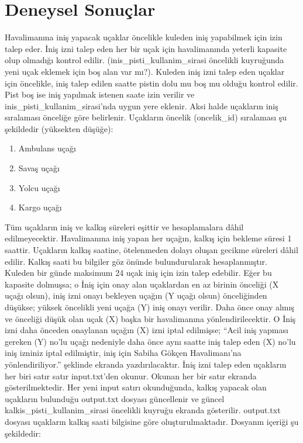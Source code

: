 \documentclass[conference]{IEEEtran}
\begin{document}
\section*{\textbf{\LARGE Deneysel Sonuçlar}}

Havalimanına iniş yapacak uçaklar öncelikle kuleden iniş yapabilmek için izin talep eder. İniş izni talep eden her bir uçak için havalimanında yeterli kapasite olup olmadığı kontrol edilir. (inis\_pisti\_kullanim\_sirasi öncelikli kuyruğunda yeni uçak eklemek için boş alan var mı?). Kuleden iniş izni talep eden uçaklar için öncelikle, iniş talep edilen saatte pistin dolu mu boş mu olduğu kontrol edilir. Pist boş ise iniş yapılmak istenen saate izin verilir ve inis\_pisti\_kullanim\_sirasi’nda uygun yere eklenir. Aksi halde uçakların iniş sıralaması önceliğe göre belirlenir. Uçakların öncelik (oncelik\_id) sıralaması şu şekildedir (yüksekten düşüğe):

\begin{enumerate}
  \item Ambulans uçağı
  \item Savaş uçağı
  \item Yolcu uçağı 
  \item Kargo uçağı
\end{enumerate}

Tüm uçakların iniş ve kalkış süreleri eşittir ve hesaplamalara dâhil edilmeyecektir. Havalimanına iniş yapan her uçağın, kalkış için bekleme süresi 1 saattir. Uçakların kalkış saatine, ötelenmeden dolayı oluşan gecikme süreleri dâhil edilir. Kalkış saati bu bilgiler göz önünde bulundurularak hesaplanmıştır. Kuleden bir günde maksimum 24 uçak iniş için izin talep edebilir. Eğer bu kapasite dolmuşsa; o İniş için onay alan uçaklardan en az birinin önceliği (X uçağı olsun), iniş izni onayı bekleyen uçağın (Y uçağı olsun) önceliğinden düşükse; yüksek öncelikli yeni uçağa (Y) iniş onayı verilir. Daha önce onay almış ve önceliği düşük olan uçak (X) başka bir havalimanına yönlendirilecektir. O İniş izni daha önceden onaylanan uçağın (X) izni iptal edilmişse; “Acil iniş yapması gereken (Y) no’lu uçağı nedeniyle daha önce aynı saatte iniş talep eden (X) no’lu iniş izniniz iptal edilmiştir, iniş için Sabiha Gökçen Havalimanı’na yönlendiriliyor.” şeklinde ekranda yazdırılacaktır. İniş izni talep eden uçakların her biri satır satır input.txt’den okunur. Okunan her bir satır ekranda gösterilmektedir. Her yeni input satırı okunduğunda, kalkış yapacak olan uçakların bulunduğu output.txt dosyası güncellenir ve güncel kalkis\_pisti\_kullanim\_sirasi öncelikli kuyruğu ekranda gösterilir. 
output.txt dosyası uçakların kalkış saati bilgisine göre oluşturulmaktadır. Dosyanın içeriği şu şekildedir: 
\end{document}
